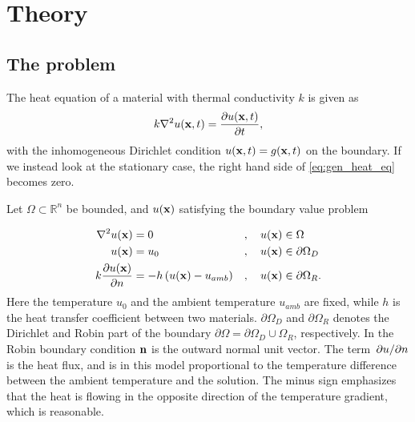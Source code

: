 \section{Theory}
\subsection{The problem}
The heat equation of a material with thermal conductivity $k$ is given as
\begin{equation}
	k\laplacian{u(\vb{x},t)} = \pdv{u(\vb{x},t)}{t}
	\label{eq:gen_heat_eq},
\end{equation}
with the inhomogeneous Dirichlet condition $u(\vb{x},t) = g(\vb{x},t)$ on the boundary. If we instead look at the stationary case, the right hand side of \eqref{eq:gen_heat_eq} becomes zero.

Let $\Omega \subset \mathbb{R}^n$ be bounded, and $u(\vb{x})$ satisfying the boundary value problem 

\begin{alignat}{3}
	\laplacian{u(\vb{x})} &= 0 &&,\quad u(\vb{x}) \in \Omega \\
	u(\vb{x}) &= u_0 &&,\quad u(\vb{x}) \in \partial\Omega_D \\
	k\pdv{u(\vb{x})}{n} &= -h\left(u(\vb{x}) - u_{amb} \right) &&, \quad u(\vb{x}) \in \partial\Omega_R.
	\label{eq:heat_bvp}
\end{alignat}
Here the temperature $u_0$ and the ambient temperature $u_{amb}$ are fixed, while $h$ is the heat transfer coefficient between two materials. $\partial\Omega_D$ and $\partial\Omega_R$ denotes the Dirichlet and Robin part of the boundary $\partial\Omega = \partial\Omega_D\cup\Omega_R$, respectively. In the Robin boundary condition  $\vb{n}$ is the outward normal unit vector. The term $\pdv*{u}{n}$ is the heat flux, and is in this model proportional to the temperature difference between the ambient temperature and the solution. The minus sign emphasizes that the heat is flowing in the opposite direction of the temperature gradient, which is reasonable.

